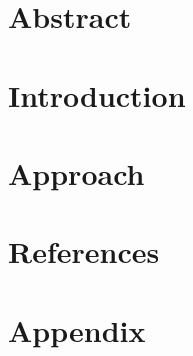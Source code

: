 



\nocite{*} %

\maketitle

\thispagestyle{empty}

\newpage

\setcounter{page}{1}

\section{Abstract}



\section{Introduction}



\section{Approach}



\newpage

\section{References}

\printbibliography

\section{Appendix}


